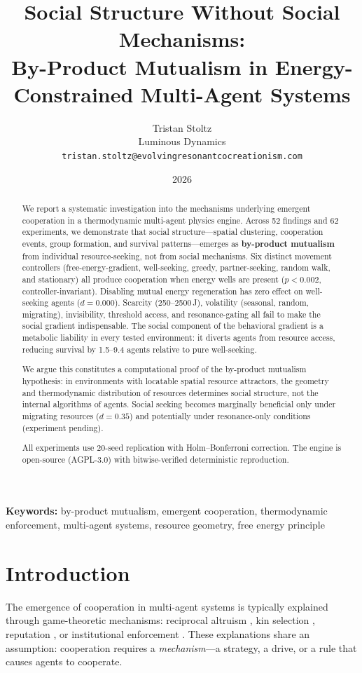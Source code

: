 \documentclass[12pt,a4paper]{article}
\title{Social Structure Without Social Mechanisms:\\By-Product Mutualism in Energy-Constrained Multi-Agent Systems}
\author{Tristan Stoltz\\Luminous Dynamics\\\texttt{tristan.stoltz@evolvingresonantcocreationism.com}}
\date{2026}
\begin{document}
\maketitle

\begin{abstract}
We report a systematic investigation into the mechanisms underlying emergent cooperation in a thermodynamic multi-agent physics engine. Across 52 findings and 62 experiments, we demonstrate that social structure---spatial clustering, cooperation events, group formation, and survival patterns---emerges as \textbf{by-product mutualism} from individual resource-seeking, not from social mechanisms. Six distinct movement controllers (free-energy-gradient, well-seeking, greedy, partner-seeking, random walk, and stationary) all produce cooperation when energy wells are present ($p < 0.002$, controller-invariant). Disabling mutual energy regeneration has zero effect on well-seeking agents ($d = 0.000$). Scarcity (250--2500\,J), volatility (seasonal, random, migrating), invisibility, threshold access, and resonance-gating all fail to make the social gradient indispensable. The social component of the behavioral gradient is a metabolic liability in every tested environment: it diverts agents from resource access, reducing survival by 1.5--9.4 agents relative to pure well-seeking.

We argue this constitutes a computational proof of the by-product mutualism hypothesis: in environments with locatable spatial resource attractors, the geometry and thermodynamic distribution of resources determines social structure, not the internal algorithms of agents. Social seeking becomes marginally beneficial only under migrating resources ($d = 0.35$) and potentially under resonance-only conditions (experiment pending).

All experiments use 20-seed replication with Holm--Bonferroni correction. The engine is open-source (AGPL-3.0) with bitwise-verified deterministic reproduction.
\end{abstract}

\textbf{Keywords:} by-product mutualism, emergent cooperation, thermodynamic enforcement, multi-agent systems, resource geometry, free energy principle

\section{Introduction}

The emergence of cooperation in multi-agent systems is typically explained through game-theoretic mechanisms: reciprocal altruism \cite{trivers1971}, kin selection \cite{hamilton1964}, reputation \cite{nowak2005}, or institutional enforcement \cite{ostrom1990}. These explanations share an assumption: cooperation requires a \emph{mechanism}---a strategy, a drive, or a rule that causes agents to cooperate.
\end{document}
